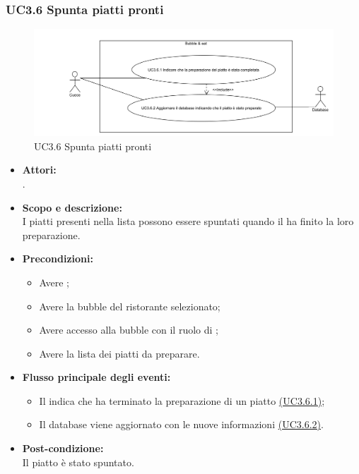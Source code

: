 \subsubsection{UC3.6 Spunta piatti pronti} \label{UC3.6}

\begin{figure}[H]
	\centering
	\includegraphics[width=15cm]{../../documenti/AnalisiDeiRequisiti/Diagrammi_img/uc3_6.png}
	\caption{UC3.6 Spunta piatti pronti}
\end{figure}

\begin{itemize}
	\item \textbf{Attori:}
	\\.
	\item \textbf{Scopo e descrizione:} 
	\\I piatti presenti nella lista possono essere spuntati quando il  ha finito la loro preparazione.
	\item \textbf{Precondizioni:}
	\begin{itemize}
		\item Avere ;
		\item Avere la bubble del ristorante selezionato;
		\item Avere accesso alla bubble con il ruolo di ;
		\item Avere la lista dei piatti da preparare.
	\end{itemize}
	\item \textbf{Flusso principale degli eventi:}
	\begin{itemize}
		\item Il  indica che ha terminato la preparazione di un piatto \hyperref[UC3.6.1]{(UC3.6.1)};
		\item Il database viene aggiornato con le nuove informazioni \hyperref[UC3.6.2]{(UC3.6.2)}.
	\end{itemize}
	\item \textbf{Post-condizione:}
	\\Il piatto è stato spuntato.
\end{itemize}

